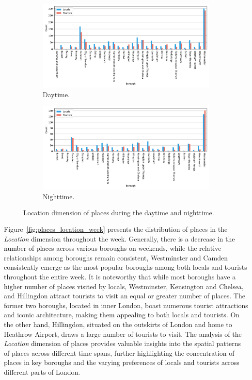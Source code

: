 \documentclass{article}
\theoremstyle{definition}
\theoremstyle{remark}
\begin{document}
\begin{figure}[!h]

\centering
\begin{subfigure}{0.6\textheight}
\centering
\includegraphics[width=0.9\linewidth]{figures/places_location_daytime.png} 
\caption{Daytime.}
\label{fig:places_location_daytime}
\end{subfigure}
\begin{subfigure}{0.6\textheight}
\centering
\includegraphics[width=0.9\linewidth]{figures/places_location_nighttime.png}
\caption{Nighttime.}
\label{fig:places_location_nighttime}
\end{subfigure}

\caption{Location dimension of places during the daytime and nighttime.}
\label{fig:places_location_day}
\end{figure}

Figure~\ref{fig:places_location_week} presents the distribution of places in the \textit{Location} dimension throughout the week. Generally, there is a decrease in the number of places across various boroughs on weekends, while the relative relationships among boroughs remain consistent, Westminster and Camden consistently emerge as the most popular boroughs among both locals and tourists throughout the entire week. It is noteworthy that while most boroughs have a higher number of places visited by locals, Westminster, Kensington and Chelsea, and Hillingdon attract tourists to visit an equal or greater number of places. The former two boroughs, located in inner London, boast numerous tourist attractions and iconic architecture, making them appealing to both locals and tourists. On the other hand, Hillingdon, situated on the outskirts of London and home to Heathrow Airport, draws a large number of tourists to visit. The analysis of the \textit{Location} dimension of places provides valuable insights into the spatial patterns of places across different time spans, further highlighting the concentration of places in key boroughs and the varying preferences of locals and tourists across different parts of London.
\end{document}

